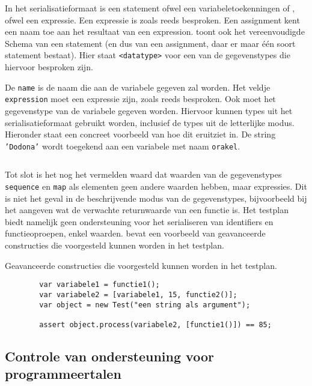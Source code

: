 In het serialisatieformaat is een statement ofwel een variabeletoekenningen of , ofwel een expressie.
Een expressie is zoals reeds besproken.
Een assignment kent een naam toe aan het resultaat van een expression.
 toont ook het vereenvoudigde  Schema van een statement (en dus van een assignment, daar er maar één soort statement bestaat).
Hier staat \texttt{<datatype>} voor een van de gegevenstypes die hiervoor besproken zijn.

De \texttt{name} is de naam die aan de variabele gegeven zal worden.
Het veldje \texttt{expression} moet een expressie zijn, zoals reeds besproken.
Ook moet het gegevenstype van de variabele gegeven worden.
Hiervoor kunnen types uit het serialisatieformaat gebruikt worden, inclusief de types uit de letterlijke modus.
Hieronder staat een concreet voorbeeld van hoe dit eruitziet in.
De string \texttt{'Dodona'} wordt toegekend aan een variabele met naam \texttt{orakel}.

\inputminted{json}{code/testplan-assignment.json}

Tot slot is het nog het vermelden waard dat waarden van de gegevenstypes \texttt{sequence} en \texttt{map} als elementen geen andere waarden hebben, maar expressies.
Dit is niet het geval in de beschrijvende modus van de gegevenstypes, bijvoorbeeld bij het aangeven wat de verwachte returnwaarde van een functie is.
Het testplan biedt namelijk geen ondersteuning voor het serialiseren van identifiers en functieoproepen, enkel waarden.
 bevat een voorbeeld van geavanceerde constructies die voorgesteld kunnen worden in het testplan.

\begin{listing}
    \caption{Geavanceerde constructies die voorgesteld kunnen worden in het testplan.}
    \label{lst:advanced-expressions}
    \begin{verbatim}
        var variabele1 = functie1();
        var variabele2 = [variabele1, 15, functie2()];
        var object = new Test("een string als argument");

        assert object.process(variabele2, [functie1()]) == 85;
    \end{verbatim}
\end{listing}

\subsection{Controle van ondersteuning voor programmeertalen}\label{subsec:vereiste-functies}

